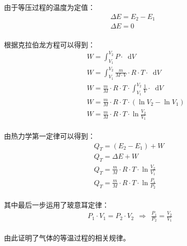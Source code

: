 \documentclass[UTF8]{ctexart}
\newcommand*{\dif}{\mathop{}\!\mathrm{d}}
\begin{document}
    由于等压过程的温度为定值：
    \begin{align}
        &\Delta E=E_2-E_1\\[4mm]
        &\Delta E=0
    \end{align}\\
    根据克拉伯龙方程可以得到：
    \begin{align}
        &~~~~W=\int_{V_1}^{V_2} P\cdot\dif V\\[4mm]
        &~~~~W=\int_{V_1}^{V_2} \frac{m}{M\cdot V}\cdot R\cdot T\cdot\dif V\\[4mm]
        &~~~~W=\frac{m}{M}\cdot R\cdot T\cdot\int_{V_1}^{V_2} \frac{1}{V}\cdot\dif V\\[4mm]
        &~~~~W=\frac{m}{M}\cdot R\cdot T\cdot\left(\ln{V_2}-\ln{V_1}\right)\\[4mm]
        &~~~~W=\frac{m}{M}\cdot R\cdot T\cdot\ln{\frac{V_2}{V_1}}
    \end{align}\\
    由热力学第一定律可以得到：
    \begin{align}
        &Q_T=(E_2-E_1)+W\\[4mm]
        &Q_T=\Delta E+W\\[4mm]
        &Q_T=\frac{m}{M}\cdot R\cdot T\cdot\ln{\frac{V_2}{V_1}}\\[4mm]
        &Q_T=\frac{m}{M}\cdot R\cdot T\cdot\ln{\frac{P_1}{P_2}}~~~~~~~~~~
    \end{align}\\
    其中最后一步运用了玻意耳定律：
    \begin{align}
        P_1\cdot V_1=P_2\cdot V_2~~\Rightarrow~~\frac{P_1}{P_2}=\frac{V_2}{V_1}
    \end{align}\\
    由此证明了气体的等温过程的相关规律。

\newpage
\end{document}
